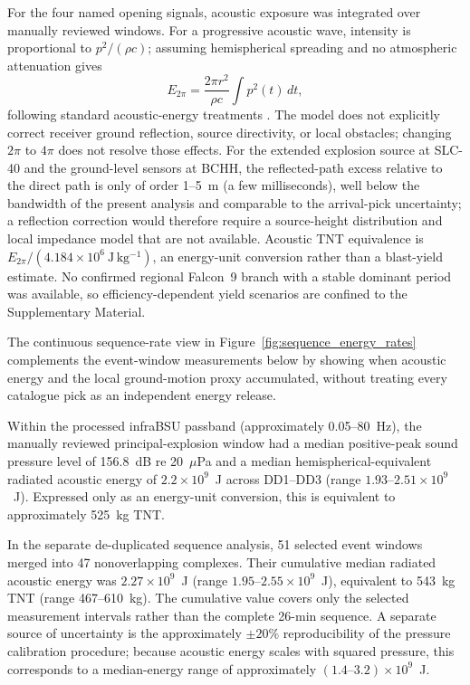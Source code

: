 \documentclass[]{seismica}
\begin{document}
For the four named opening signals, acoustic exposure was integrated over
manually reviewed windows. For a progressive acoustic wave, intensity is
proportional to $p^2/(\rho c)$; assuming hemispherical spreading and no
atmospheric attenuation gives
\begin{equation}
 E_{2\pi}=\frac{2\pi r^2}{\rho c}\int p^2(t)\,dt,
 \label{eq:acoustic_energy}
\end{equation}
following standard acoustic-energy treatments
\citep[e.g.,][]{johnson_aster_2005}. The model does not explicitly correct receiver ground reflection, source
directivity, or local obstacles; changing $2\pi$ to $4\pi$ does not resolve
those effects. For the extended explosion source at SLC-40 and the
ground-level sensors at BCHH, the reflected-path excess relative to the
direct path is only of order 1--5~m (a few milliseconds), well below the
bandwidth of the present analysis and comparable to the arrival-pick
uncertainty; a reflection correction would therefore require a source-height
distribution and local impedance model that are not available. Acoustic TNT equivalence is
$E_{2\pi}/(4.184\times10^6~\mathrm{J\,kg^{-1}})$, an energy-unit conversion
rather than a blast-yield estimate. No confirmed regional Falcon~9 branch with
a stable dominant period was available, so efficiency-dependent yield scenarios
are confined to the Supplementary Material.

The continuous sequence-rate view in
Figure~\ref{fig:sequence_energy_rates} complements the event-window
measurements below by showing when acoustic energy and the local ground-motion
proxy accumulated, without treating every catalogue pick as an independent
energy release.

Within the processed infraBSU passband (approximately 0.05--80~Hz), the
manually reviewed principal-explosion window had a median positive-peak sound
pressure level of 156.8~dB re 20~$\mu$Pa and a median
hemispherical-equivalent radiated acoustic energy of
$2.2\times10^9$~J across DD1--DD3
(range $1.93$--$2.51\times10^9$~J). Expressed only as an energy-unit
conversion, this is equivalent to approximately 525~kg TNT.

In the separate de-duplicated sequence analysis, 51 selected event windows
merged into 47 nonoverlapping complexes. Their cumulative median radiated
acoustic energy was $2.27\times10^9$~J
(range $1.95$--$2.55\times10^9$~J), equivalent to 543~kg TNT
(range 467--610~kg). The cumulative value covers only the selected
measurement intervals rather than the complete 26-min sequence. A separate
source of uncertainty is the approximately $\pm20\%$ reproducibility of the
pressure calibration procedure; because acoustic energy scales with squared
pressure, this corresponds to a median-energy range of approximately
$(1.4\text{--}3.2)\times10^9$~J.
\end{document}
